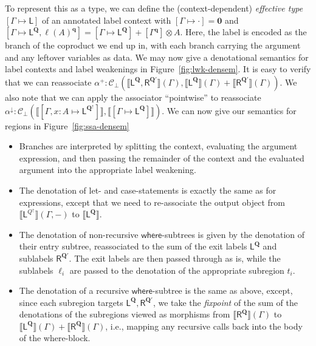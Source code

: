 \documentclass[acmsmall,screen,review]{acmart}
\newcommand{\mc}[1]{\ensuremath{\mathcal{#1}}}
\newcommand{\mb}[1]{\ensuremath{\mathbf{#1}}}
\newcommand{\ms}[1]{\ensuremath{\mathsf{#1}}}
\newcommand{\etoty}[1]{[#1]}
\newcommand{\ltoty}[2]{[#1 \mapsto #2]}
\newcommand{\dnt}[1]{\llbracket{#1}\rrbracket}
\newcommand{\subiterexp}{\texorpdfstring{\(\lambda_{\ms{iter}}\)}{lambda-iter}}
\newcommand{\zeroqv}[1]{#1^\uparrow}
\begin{document}
To represent this as a type, we can define the (context-dependent) \emph{effective type}
$\ltoty{\Gamma}{\ms{L}}$ of an annotated label context with $\ltoty{\Gamma}{\cdot} = \mb{0}$ and
$\ltoty{\Gamma}{\ms{L}^{\mb{Q}}, \ell(A)^{\mb{q}}} = \ltoty{\Gamma}{\ms{L}^{\mb{Q}}} +
\etoty{\Gamma^{\mb{q}}} \otimes A$.    
Here, the label is encoded as the branch of the coproduct we end up in, with each branch carrying
the argument and any leftover variables as data. We may now give a denotational semantics for label 
contexts and label weakenings in Figure~\ref{fig:lwk-densem}. 
It is easy to verify that we can reassociate 
$
\alpha^+ : \mc{C}_\bot(
  \dnt{\ms{L}^{\mb{Q}}, \ms{R}^{\mb{Q}'}}(\Gamma),
  \dnt{\ms{L}^{\mb{Q}}}(\Gamma) + \dnt{\ms{R}^{\mb{Q}'}}(\Gamma)
)
$.
We also note that we can apply the 
associator ``pointwise'' to reassociate
$\alpha^\downarrow: \mc{C}_\bot(
  \dnt{\ltoty{\Gamma, x : A}{\ms{L}^{\zeroqv{\mb{Q}}}}}, 
  \dnt{\ltoty{\Gamma}{\ms{L}^{\mb{Q}}}}
)$. 
%
We can now give our semantics for regions in Figure~\ref{fig:ssa-densem}
\begin{itemize}
  \item Branches are interpreted by splitting the context, evaluating the argument expression,
  and then passing the remainder of the context and the evaluated argument into the appropriate
  label weakening.
  \item The denotation of let- and case-statements is exactly the same as for expressions,
  except that we need to re-associate the output object from 
  $\dnt{\ms{L}^{\zeroqv{Q}}}(\Gamma, -)$ to $\dnt{\ms{L}^{\mb{Q}}}$.
  \item The denotation of non-recursive \ms{where}-subtrees is given by the denotation of their
  entry subtree, reassociated to the sum of the exit labels $\ms{L}^{\mb{Q}}$ and sublabels 
  $\ms{R}^{\mb{Q}'}$. The exit labels are then passed through as is, while the sublabels $\ell_i$ 
  are passed to the denotation of the appropriate subregion $t_i$.
  \item The denotation of a recursive \ms{where}-subtree is the same as above, except, since each
  subregion targets $\ms{L}^{\mb{Q}}, \ms{R}^{\mb{Q}'}$, we take the \emph{fixpoint} of the sum
  of the denotations of the subregions viewed as morphisms from $\dnt{\ms{R}^{\mb{Q}}}(\Gamma)$
  to $\dnt{\ms{L}^{\mb{Q}}}(\Gamma) + \dnt{\ms{R}^{\mb{Q}}}(\Gamma)$, i.e., mapping any recursive
  calls back into the body of the where-block.
\end{itemize}
\end{document}
